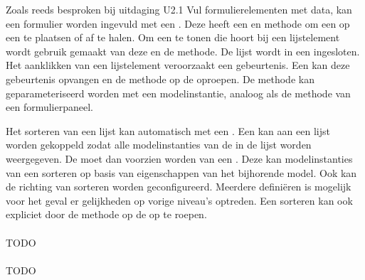 Zoals reeds besproken bij uitdaging U2.1 Vul formulierelementen met data, kan een formulier worden ingevuld met een .
Deze  heeft een  en  methode om een  op een  te plaatsen of af te halen.
Om een  te tonen die hoort bij een lijstelement wordt gebruik gemaakt van deze  en de  methode.
De lijst wordt in een  ingesloten.
Het aanklikken van een lijstelement veroorzaakt een  gebeurtenis.
Een  kan deze gebeurtenis opvangen en de  methode op de  oproepen.
De methode kan geparameteriseerd worden met een modelinstantie, analoog als de  methode van een formulierpaneel.

Het sorteren van een lijst kan automatisch met een .
Een  kan aan een lijst worden gekoppeld zodat alle modelinstanties van de  in de lijst worden weergegeven.
De  moet dan voorzien worden van een .
Deze kan modelinstanties van een  sorteren op basis van eigenschappen van het bijhorende model.
Ook kan de richting van sorteren worden geconfigureerd.
Meerdere  definiëren is mogelijk voor het geval er gelijkheden op vorige niveau's optreden.
Een  sorteren kan ook expliciet door de  methode op de  op te roepen.

\paragraph{\kendo}
TODO

\paragraph{\lungo}
TODO

\begin{table}[H]
\centering
{}
\caption{Scores voor U13: Lijsten}
\label{tabel:evaluatie-gebruik-u13}
\end{table}

